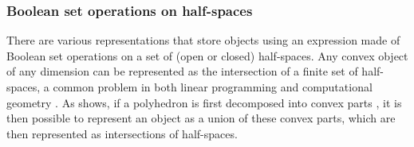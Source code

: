 \subsubsection{Boolean set operations on half-spaces}

There are various representations that store objects using an expression made of Boolean set operations on a set of (open or closed) half-spaces.
Any convex object of any dimension can be represented as the intersection of a finite set of half-spaces, a common problem in both linear programming and computational geometry \citep{Shamos76,Preparata79}.
As  shows, if a polyhedron is first decomposed into convex parts \citep{Chazelle79,Bajaj90}, it is then possible to represent an object as a union of these convex parts, which are then represented as intersections of half-spaces.
\begin{figure}[tb]
\centering
{}
\end{figure}
